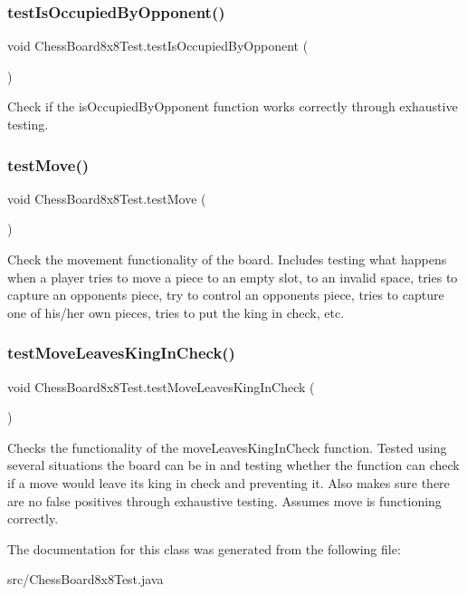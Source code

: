 \subsubsection{\texorpdfstring{test\+Is\+Occupied\+By\+Opponent()}{testIsOccupiedByOpponent()}}
{\footnotesize\ttfamily void Chess\+Board8x8\+Test.\+test\+Is\+Occupied\+By\+Opponent (\begin{DoxyParamCaption}{ }\end{DoxyParamCaption})}

Check if the is\+Occupied\+By\+Opponent function works correctly through exhaustive testing. \mbox{\label{class_chess_board8x8_test_a630e1345d39197c0771f835f52b95f78}} 
\subsubsection{\texorpdfstring{test\+Move()}{testMove()}}
{\footnotesize\ttfamily void Chess\+Board8x8\+Test.\+test\+Move (\begin{DoxyParamCaption}{ }\end{DoxyParamCaption})}

Check the movement functionality of the board. Includes testing what happens when a player tries to move a piece to an empty slot, to an invalid space, tries to capture an opponent\textquotesingle{}s piece, try to control an opponent\textquotesingle{}s piece, tries to capture one of his/her own pieces, tries to put the king in check, etc. \mbox{\label{class_chess_board8x8_test_a4404a29c2dda879be760b3eb06deb16e}} 
\subsubsection{\texorpdfstring{test\+Move\+Leaves\+King\+In\+Check()}{testMoveLeavesKingInCheck()}}
{\footnotesize\ttfamily void Chess\+Board8x8\+Test.\+test\+Move\+Leaves\+King\+In\+Check (\begin{DoxyParamCaption}{ }\end{DoxyParamCaption})}

Checks the functionality of the move\+Leaves\+King\+In\+Check function. Tested using several situations the board can be in and testing whether the function can check if a move would leave its king in check and preventing it. Also makes sure there are no false positives through exhaustive testing. Assumes \textquotesingle{}move\textquotesingle{} is functioning correctly. 

The documentation for this class was generated from the following file\+:\begin{DoxyCompactItemize}
\item 
src/Chess\+Board8x8\+Test.\+java\end{DoxyCompactItemize}
